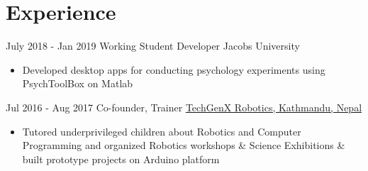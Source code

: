 \documentclass[letterpaper]{twentysecondcv} %
\begin{document}

\section{Experience}

\begin{twenty} %
    \twentyitem
    	{July 2018 -}
		{Jan 2019}
        {Working Student Developer}
        {Jacobs University}
        {}
        {\begin{itemize}
        \item Developed  desktop apps for conducting psychology experiments using PsychToolBox on Matlab\\
        \end{itemize}} 
    \begin{comment}    
    \twentyitem
   		{June 2018 -}
		{Present}
        {Business Development Manager- Germany}
        {\href{http://www.boldcode.io}{Boldcode.io, Paris, France}}
        {}
        {
        {\begin{itemize}
        \item Contacted clients and managed client portfolio for Software and Web Development outsourcing projects
    \end{itemize}}
        }
    \end{comment}
        
        \twentyitem
   		{Jul 2016 -}
		{Aug 2017}
        {Co-founder, Trainer}
        {\href{https://techgenxblog.wordpress.com}{TechGenX Robotics, Kathmandu, Nepal}}
        {}
        {
        {\begin{itemize}
        \item Tutored underprivileged children about Robotics and Computer Programming and organized Robotics workshops \& Science Exhibitions \& built prototype projects on Arduino platform
    \end{itemize}}
        }
        
   

\end{twenty}
\end{document}

